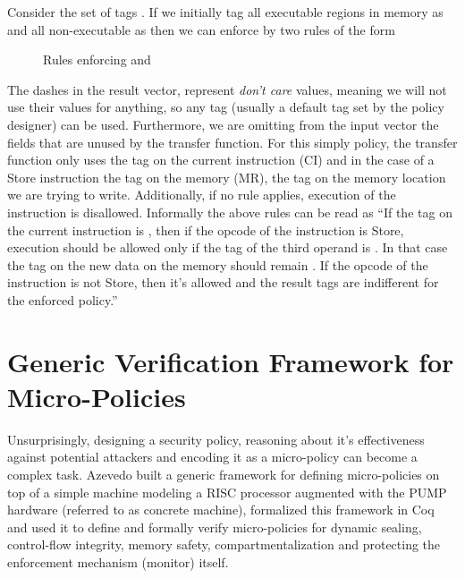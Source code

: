 


Consider the set of tags \TAGS{\DATA,\INSTRname}. If we initially tag
all executable regions in memory as \INSTRname and all non-executable
as \DATAname then we can enforce \NWC by two rules of the form

\begin{figure}[H]
\bigskip

\bigskip

\caption{Rules enforcing \NWC and \NXD}
\end{figure}

The dashes in the result vector, represent \textit{don't care} values,
meaning we will not use their values for anything, so any tag (usually
a default tag set by the policy designer) can be used. Furthermore, we
are omitting from the input vector the fields that are unused by the
transfer function. For this simply policy, the transfer function only
uses the tag on the current instruction (CI) and in the case of a
Store instruction the tag on the memory (MR), \IE the tag on the
memory location we are trying to write. Additionally, if no rule
applies, execution of the instruction is disallowed. Informally the
above rules can be read as ``If the tag on the current instruction is
\INSTR{}, then if the opcode of the instruction is Store, execution
should be allowed only if the tag of the third operand is \DATA. In
that case the tag on the new data on the memory should remain
\DATA. If the opcode of the instruction is not Store, then it's
allowed and the result tags are indifferent for the enforced policy.''

\section{Generic Verification Framework for Micro-Policies}
\label{sec:framework}

Unsurprisingly, designing a security policy, reasoning about it's effectiveness
against potential attackers and encoding it as a micro-policy can become a
complex task. Azevedo \ETAL \cite{pump_popl2015} built a generic framework for
defining micro-policies on top of a simple machine modeling a RISC processor
augmented with the PUMP hardware (referred to as concrete machine), formalized
this framework in Coq and used it to define and formally verify micro-policies
for dynamic sealing, control-flow integrity, memory safety, compartmentalization
and protecting the enforcement mechanism (monitor) itself.

